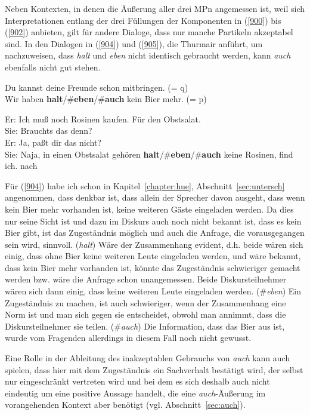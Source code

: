 {Neben Kontexten, in denen die Äußerung aller drei MPn angemessen ist, weil sich Interpretationen entlang der drei Füllungen der Komponenten in (\ref{900}) bis (\ref{902}) anbieten, gilt für andere Dialoge, dass nur manche Partikeln akzeptabel sind. In den Dialogen in (\ref{904}) und (\ref{905}), die Thurmair anführt, um nachzuweisen, dass \textit{halt} und \textit{eben} nicht identisch gebraucht werden, kann \textit{auch} ebenfalls nicht gut stehen.

\begin{exe}
	\ex\label{904}
	Du kannst deine Freunde schon mitbringen. (= q)\\
	Wir haben \textbf{halt}/\#\textbf{eben}/\#\textbf{auch} kein Bier mehr. (= p)
\end{exe}

\begin{exe}
	\ex\label{905}
	Er: Ich muß noch Rosinen kaufen. Für den Obstsalat.\\
	Sie: Brauchts das denn?\\
	Er: Ja, paßt dir das nicht?\\
	Sie: Naja, in einen Obstsalat gehören \textbf{halt}/\#\textbf{eben}/\#\textbf{auch} keine Rosinen, find ich.
	\hfill\hbox {nach \citet[124]{Thurmair1989}}
\end{exe}
Für (\ref{904}) habe ich schon in Kapitel~\ref{chapter:hue}, Abschnitt~\ref{sec:untersch} angenommen, dass denkbar ist, dass allein der Sprecher davon ausgeht, dass wenn kein Bier mehr vorhanden ist, keine weiteren Gäste eingeladen werden. Da dies nur seine Sicht ist und dazu im Diskurs auch noch nicht bekannt ist, dass es kein Bier gibt, ist das Zugeständnis möglich und auch die Anfrage, die vorausgegangen sein wird, sinnvoll. (\textit{halt}) Wäre der Zusammenhang evident, d.h. beide wären sich einig, dass ohne Bier keine weiteren Leute eingeladen werden, und wäre bekannt, dass kein Bier mehr vorhanden ist, könnte das Zugeständnis schwieriger gemacht werden bzw. wäre die Anfrage schon unangemessen.  Beide Diskursteilnehmer wären sich dann einig, dass keine weiteren Leute eingeladen werden. (\#\textit{eben}) Ein Zugeständnis zu machen, ist auch schwieriger, wenn der Zusammenhang eine Norm ist und man sich gegen sie entscheidet, obwohl man annimmt, dass die Diskursteilnehmer sie teilen. (\#\textit{auch}) Die Information, dass das Bier aus ist, wurde vom Fragenden allerdings in diesem Fall noch nicht gewusst. 

Eine Rolle in der Ableitung des inakzeptablen Gebrauchs von \textit{auch} kann auch spielen, dass hier mit dem Zugeständnis ein Sachverhalt bestätigt wird, der selbst nur eingeschränkt vertreten wird und bei dem es sich deshalb auch nicht eindeutig um eine positive Aussage handelt, die eine \textit{auch}-Äußerung im vorangehenden Kontext aber benötigt (vgl. Abschnitt~\ref{sec:auch}). 

}
